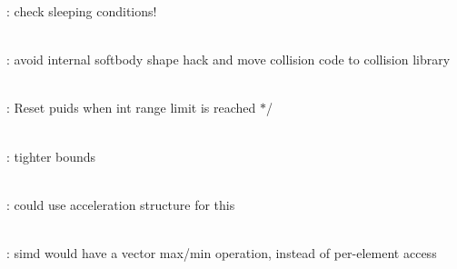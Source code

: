 \begin{DoxyRefList}
\label{todo__todo000037}%
%
\+: check sleeping conditions!  
\item[Member \doxylink{classbt_soft_body_aced0f5421eeb1491a3fd77bb91e2e5af}{bt\+Soft\+Body\+::set\+Collision\+Shape} (bt\+Collision\+Shape \texorpdfstring{$\ast$}{*}collision\+Shape)]\hfill \\
\label{todo__todo000039}%
%
\+: avoid internal softbody shape hack and move collision code to collision library  
\item[Member \doxylink{structbt_sparse_sdf_a08dbaa356f577ebbd0808329766111d1}{bt\+Sparse\+Sdf\texorpdfstring{$<$}{<} CELLSIZE \texorpdfstring{$>$}{>}\+::Garbage\+Collect} (int lifetime=256)]\hfill \\
\label{todo__todo000040}%
%
\+: Reset puid\textquotesingle{}s when int range limit is reached \texorpdfstring{$\ast$}{*}/  
\item[Member \doxylink{classbt_sphere_triangle_collision_algorithm_af6de517d0a45abb91df4f61c5867c8f1}{bt\+Sphere\+Triangle\+Collision\+Algorithm\+::process\+Collision} (const \doxylink{structbt_collision_object_wrapper}{bt\+Collision\+Object\+Wrapper} \texorpdfstring{$\ast$}{*}body0\+Wrap, const \doxylink{structbt_collision_object_wrapper}{bt\+Collision\+Object\+Wrapper} \texorpdfstring{$\ast$}{*}body1\+Wrap, const \doxylink{structbt_dispatcher_info}{bt\+Dispatcher\+Info} \&dispatch\+Info, \doxylink{classbt_manifold_result}{bt\+Manifold\+Result} \texorpdfstring{$\ast$}{*}result\+Out)]\hfill \\
\label{todo__todo000018}%
%
\+: tighter bounds  
\item[Member \doxylink{classbt_triangle_mesh_a3b521a1faa5862a818d9f983230749a2}{bt\+Triangle\+Mesh\+::find\+Or\+Add\+Vertex} (const bt\+Vector3 \&vertex, bool remove\+Duplicate\+Vertices)]\hfill \\
\label{todo__todo000024}%
%
\+: could use acceleration structure for this  
\item[Member \doxylink{bt_collision_shape_8h_a3dfe4c1972499d06147b919e9db11ab8}{calculate\+Temporal\+Aabb} (const bt\+Transform \&cur\+Trans, const bt\+Vector3 \&linvel, const bt\+Vector3 \&angvel, \doxylink{bt_scalar_8h_a1e5824cfc8adbf5a77f2622132d16018}{bt\+Scalar} time\+Step, bt\+Vector3 \&temporal\+Aabb\+Min, bt\+Vector3 \&temporal\+Aabb\+Max) const]\hfill \\
\label{todo__todo000020}%
%
\+: simd would have a vector max/min operation, instead of per-\/element access  

\end{DoxyRefList}
